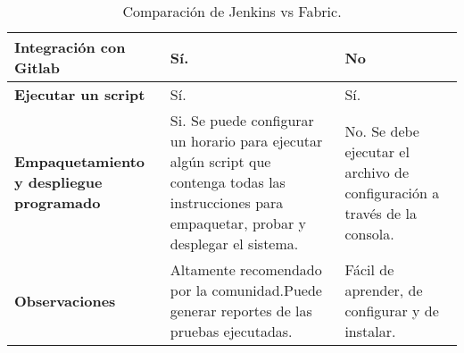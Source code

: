 \begin{table}[h]
\begin{tabular}{| p{} | p{} | p{} |}
\textbf{Integración con Gitlab}                  & Sí.                                                                                                                                                & No                                                                                                                                                           \\ \hline
\textbf{Ejecutar un script}                      & Sí.                                                                                                                                                & Sí.                                                                                                                                                          \\ \hline
\textbf{Empaquetamiento y despliegue programado} & Si. Se puede configurar un horario para ejecutar algún script que contenga todas las instrucciones para empaquetar, probar y desplegar el sistema. & No. Se debe ejecutar el archivo de configuración a través de la consola.                                                                                     \\ \hline
\textbf{Observaciones}                           & Altamente recomendado por la comunidad.Puede generar reportes de las pruebas ejecutadas.                                                           & Fácil de aprender, de configurar y de instalar.                                                                                                              \\ \hline
\end{tabular}
\caption{Comparación de Jenkins vs Fabric.}
\label{tabla:6.1}
\end{table}
